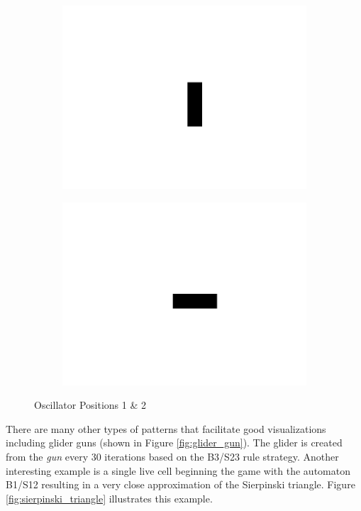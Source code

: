 \documentclass[11pt]{article}
\begin{document}
\begin{figure}[!ht]
	\centering
	\begin{subfigure}{.45\textwidth}
		\centering
  	  	\includegraphics[width=1\linewidth]{images/blinker1.png}
  	  	\label{fig:blinker1}
	\end{subfigure}
	\begin{subfigure}{.45\textwidth}
  	  	\centering
  	  	\includegraphics[width=1\linewidth]{images/blinker2.png}
  	  	\label{fig:blinker2}
	\end{subfigure}
	\caption{Oscillator Positions 1 \& 2}
	\label{fig:oscillator}
\end{figure}

There are many other types of patterns that facilitate good visualizations including glider guns (shown in Figure \ref{fig:glider_gun}).  The glider is created from the \textit{gun} every 30 iterations based on the B3/S23 rule strategy.  Another interesting example is a single live cell beginning the game with the automaton B1/S12 resulting in a very close approximation of the Sierpinski triangle\cite{sierpinski}.  Figure \ref{fig:sierpinski_triangle} illustrates this example.
\end{document}
